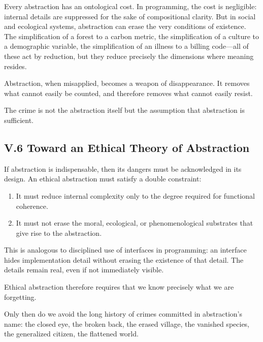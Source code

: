 \documentclass[11pt,letterpaper]{article}
\begin{document}
Every abstraction has an ontological cost. In programming, the cost is negligible: internal details are suppressed for the sake of compositional clarity. But in social and ecological systems, abstraction can erase the very conditions of existence. The simplification of a forest to a carbon metric, the simplification of a culture to a demographic variable, the simplification of an illness to a billing code—all of these act by reduction, but they reduce precisely the dimensions where meaning resides.

Abstraction, when misapplied, becomes a weapon of disappearance. It removes what cannot easily be counted, and therefore removes what cannot easily resist.

The crime is not the abstraction itself but the assumption that abstraction is sufficient.

\subsection{V.6 Toward an Ethical Theory of Abstraction}

If abstraction is indispensable, then its dangers must be acknowledged in its design. An ethical abstraction must satisfy a double constraint:

\begin{enumerate}
\item It must reduce internal complexity only to the degree required for functional coherence.
\item It must not erase the moral, ecological, or phenomenological substrates that give rise to the abstraction.
\end{enumerate}

This is analogous to disciplined use of interfaces in programming: an interface hides implementation detail without erasing the existence of that detail. The details remain real, even if not immediately visible.

Ethical abstraction therefore requires that we know precisely what we are forgetting.

Only then do we avoid the long history of crimes committed in abstraction’s name: the closed eye, the broken back, the erased village, the vanished species, the generalized citizen, the flattened world.

\newpage

\end{document}
